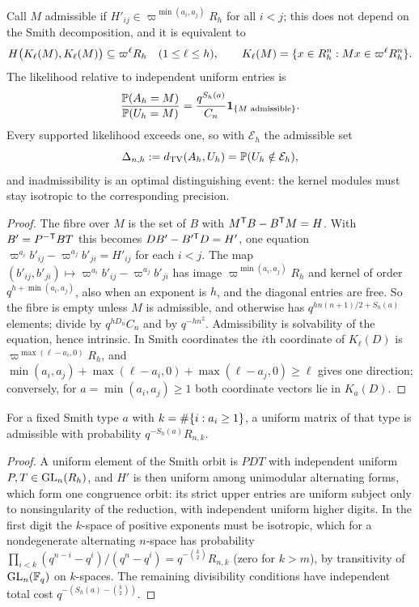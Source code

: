 \begin{theorem}\label{spn:thm:local-density}
Call $M$ admissible if $H'_{ij}\in\varpi^{\min(a_i,a_j)}R_h$ for all $i<j$; this does not depend on the
Smith decomposition, and it is equivalent to
\[
 H\bigl(K_\ell(M),K_\ell(M)\bigr)\subseteq\varpi^\ell R_h\quad(1\le\ell\le h),\qquad
 K_\ell(M)=\{x\in R_h^n:Mx\in\varpi^\ell R_h^n\}.
\]
The likelihood relative to independent uniform entries is
\[
 \frac{\mathbb{P}(A_h=M)}{\mathbb{P}(U_h=M)}=\frac{q^{S_h(a)}}{C_n}\mathbf 1_{\{M\text{ admissible}\}}.
\] Every supported
likelihood exceeds one, so with $\mathcal E_h$ the admissible set
\begin{equation}\label{spn:eq:local-support-tv}
 \Delta_{n,h}:=d_{\mathrm{TV}}(A_h,U_h)=\mathbb{P}(U_h\notin\mathcal E_h),
\end{equation}
and inadmissibility is an optimal distinguishing event: the kernel modules must stay isotropic to
the corresponding precision.
\end{theorem}
\begin{proof}
The fibre over $M$ is the set of $B$ with $M^{\mathsf{T}}B-B^{\mathsf{T}}M=H$. With $B'=P^{-\mathsf{T}}BT$ this becomes
$DB'-B'^{\mathsf{T}}D=H'$, one equation $\varpi^{a_i}b'_{ij}-\varpi^{a_j}b'_{ji}=H'_{ij}$ for each $i<j$. The
map $(b'_{ij},b'_{ji})\mapsto\varpi^{a_i}b'_{ij}-\varpi^{a_j}b'_{ji}$ has image $\varpi^{\min(a_i,a_j)}R_h$
and kernel of order $q^{h+\min(a_i,a_j)}$, also when an exponent is $h$, and the diagonal entries are
free. So the fibre is empty unless $M$ is admissible, and otherwise has $q^{hn(n+1)/2+S_h(a)}$
elements; divide by $q^{hD_n}C_n$ and by $q^{-hn^2}$. Admissibility is solvability of the equation,
hence intrinsic. In Smith coordinates the $i$th coordinate of $K_\ell(D)$ is
$\varpi^{\max(\ell-a_i,0)}R_h$, and $\min(a_i,a_j)+\max(\ell-a_i,0)+\max(\ell-a_j,0)\ge\ell$ gives one
direction; conversely, for $a=\min(a_i,a_j)\ge1$ both coordinate vectors lie in $K_a(D)$.
\end{proof}

\begin{lemma}\label{spn:lem:local-orientation}
For a fixed Smith type $a$ with $k=\#\{i:a_i\ge1\}$, a uniform matrix of that type is admissible
with probability $q^{-S_h(a)}R_{n,k}$.
\end{lemma}
\begin{proof}
A uniform element of the Smith orbit is $PDT$ with independent uniform $P,T\in\operatorname{GL}_n(R_h)$, and $H'$ is
then uniform among unimodular alternating forms, which form one congruence orbit: its strict upper
entries are uniform subject only to nonsingularity of the reduction, with independent uniform higher
digits. In the first digit the $k$-space of positive exponents must be isotropic, which for a
nondegenerate alternating $n$-space has probability
$\prod_{i<k}(q^{n-i}-q^i)/(q^n-q^i)=q^{-\binom k2}R_{n,k}$ (zero for $k>m$), by transitivity of
$\operatorname{GL}_n(\mathbb{F}_q)$ on $k$-spaces. The remaining divisibility conditions have independent total cost
$q^{-(S_h(a)-\binom k2)}$.
\end{proof}

